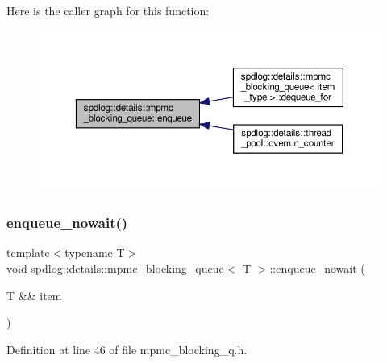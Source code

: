 Here is the caller graph for this function\+:
\nopagebreak
\begin{figure}[H]
\begin{center}
\leavevmode
\includegraphics[width=350pt]{classspdlog_1_1details_1_1mpmc__blocking__queue_a3795640b651fcb2de66a21ef2bc221f1_icgraph}
\end{center}
\end{figure}
\mbox{\label{classspdlog_1_1details_1_1mpmc__blocking__queue_a1280489c9035a705f50f04905a5ed394}} 
\subsubsection{\texorpdfstring{enqueue\+\_\+nowait()}{enqueue\_nowait()}}
{\footnotesize\ttfamily template$<$typename T$>$ \\
void \hyperlink{classspdlog_1_1details_1_1mpmc__blocking__queue}{spdlog\+::details\+::mpmc\+\_\+blocking\+\_\+queue}$<$ T $>$\+::enqueue\+\_\+nowait (\begin{DoxyParamCaption}\item[{T \&\&}]{item }\end{DoxyParamCaption})\hspace{0.3cm}{\ttfamily [inline]}}



Definition at line 46 of file mpmc\+\_\+blocking\+\_\+q.\+h.

